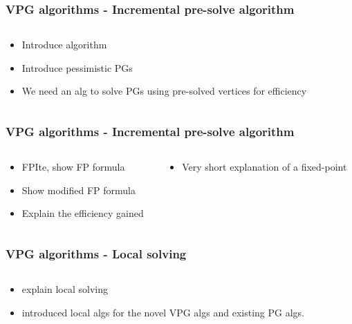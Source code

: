 \documentclass[handout,aspectratio=169]{beamer}
\begin{document}

\begin{frame}[t]
\frametitle{VPG algorithms - Incremental pre-solve algorithm}
\begin{columns}[t]
	\begin{column}{0.5\textwidth}
		\begin{itemize}
			\item Introduce algorithm
			\item Introduce pessimistic PGs
			\item We need an alg to solve PGs using pre-solved vertices for efficiency
		\end{itemize}
	\end{column}
	\begin{column}{0.5\textwidth}
	\end{column}
\end{columns}
\end{frame}


\begin{frame}[t]
\frametitle{VPG algorithms - Incremental pre-solve algorithm}
\begin{columns}[t]
	\begin{column}{0.5\textwidth}
		\begin{itemize}
			\item FPIte, show FP formula
			\item Show modified FP formula
			\item Explain the efficiency gained
		\end{itemize}
	\end{column}
	\begin{column}{0.5\textwidth}
		\begin{itemize}
			\item Very short explanation of a fixed-point
		\end{itemize}
	\end{column}
\end{columns}
\end{frame}


\begin{frame}[t]
\frametitle{VPG algorithms - Local solving}
\begin{columns}[t]
	\begin{column}{0.5\textwidth}
		\begin{itemize}
			\item explain local solving
			\item introduced local algs for the novel VPG algs and existing PG algs.
		\end{itemize}
	\end{column}
	\begin{column}{0.5\textwidth}
	\end{column}
\end{columns}
\end{frame}
\end{document}
